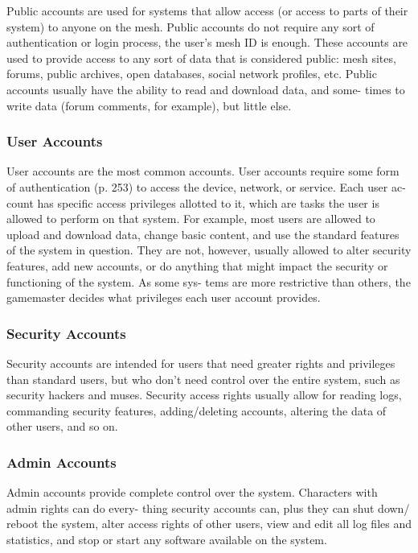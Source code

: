 Public accounts are used for systems that allow 
access (or access to parts of their system) to anyone 
on the mesh. Public accounts do not require any sort 
of authentication or login process, the user's mesh ID 
is enough. These accounts are used to provide access 
to any sort of data that is considered public: mesh 
sites, forums, public archives, open databases, social 
network profiles, etc. Public accounts usually have 
the ability to read and download data, and some-
times to write data (forum comments, for example), 
but little else.

\subsubsection{User Accounts}

User accounts are the most common accounts. User 
accounts require some form of authentication (p. 253) 
to access the device, network, or service. Each user ac-
count has specific access privileges allotted to it, which 
are tasks the user is allowed to perform on that system. 
For example, most users are allowed to upload and 
download data, change basic content, and use the 
standard features of the system in question. They are 
not, however, usually allowed to alter security features, 
add new accounts, or do anything that might impact 
the security or functioning of the system. As some sys-
tems are more restrictive than others, the gamemaster 
decides what privileges each user account provides.

\subsubsection{Security Accounts}

Security accounts are intended for users that need 
greater rights and privileges than standard users, but 
who don't need control over the entire system, such 
as security hackers and muses. Security access rights 
usually allow for reading logs, commanding security 
features, adding/deleting accounts, altering the data of 
other users, and so on.

\subsubsection{Admin Accounts}

Admin accounts provide complete control over the 
system. Characters with admin rights can do every-
thing security accounts can, plus they can shut down/
reboot the system, alter access rights of other users, 
view and edit all log files and statistics, and stop or 
start any software available on the system.

